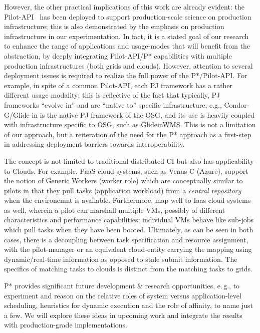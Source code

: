 \documentclass[conference]{IEEEtran}
\begin{document}
However, the other practical implications of this work are already
evident: the Pilot-API~\cite{pilot_api} has been deployed to support
production-scale science on production infrastructure; this is also
demonstrated by the emphasis on production infrastructure in our
experimentation. In fact, it is a stated goal of our research to
enhance the range of applications and usage-modes that will benefit
from the \pilot abstraction, by deeply integrating Pilot-API/P*
capabilities with multiple production infrastructures (both grids and
clouds).  However, attention to several deployment issues is required
to realize the full power of the P*/Pilot-API. For example, in spite
of a common Pilot-API, each PJ framework has a rather different usage
modality; this is reflective of the fact that typically, PJ frameworks
``evolve in'' and are ``native to'' specific infrastructure, e.g.,
Condor-G/Glide-in is the native PJ framework of the OSG, and its use
is heavily coupled with infrastructure specific to OSG, such as
GlideinWMS. This is not a limitation of our approach, but a
reiteration of the need for the P* approach as a first-step in
addressing deployment barriers towards interoperability.

The \pilotjobs concept is not limited to traditional distributed CI
but also has applicability to Clouds. For example, PaaS cloud systems,
such as Venus-C (Azure), support the notion of Generic Workers (worker
role) which are conceptually similar to pilots in that they pull tasks
(application workload) from a {\it central repository} when the
environemnt is available. Furthermore, \pilotjobs map well to Iaas
cloud systems as well, wherein a pilot can marshall multiple VMs,
possibly of different characteristics and performance capabilities;
individual VMs behave like sub-jobs which pull tasks when they have
been booted. Ultimately, as can be seen in both cases, there is a
decoupling between task specification and resource assignment, with
the pilot-manager or an equivalent cloud-entity carrying the mapping
using dynamic/real-time information as opposed to stale submit
information. The specifics of matching tasks to clouds is distinct
from the matching tasks to grids.

P* provides significant future development \& research opportunities,
e.\,g., to experiment and reason on the relative roles of system
versus application-level scheduling, heuristics for dynamic execution
and the role of affinity, to name just a few.  We will explore these
ideas in upcoming work and integrate the results with production-grade
implementations.
\end{document}
